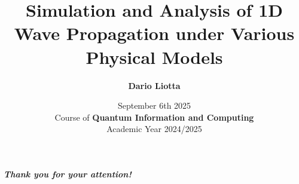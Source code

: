\documentclass[10pt,externalviewer]{beamer}
\title{Simulation and Analysis of 1D Wave Propagation under Various Physical Models}
\author[Dario Liotta]{\large{\textbf{Dario Liotta}}}
\institute[Physics of Data (UniPD)]{
\begin{minipage}[c]{3.4truecm}
\texttt{[image: logo-unipd]}
\end{minipage}
\begin{minipage}[c]{2truecm}
   \begin{flushleft}
   \end{flushleft}
\end{minipage}
\begin{minipage}[c]{4.2truecm}
\texttt{[image: logo-dfa]}
\end{minipage}}
\date{September 6th 2025 \\ Course of \textbf{Quantum Information and Computing} \\ Academic Year 2024/2025}
\begin{document}
\begin{frame}[plain]
\titlepage
\end{frame}







\begin{frame}[c,plain]
  \fontsize{20pt}{10}\selectfont
      \begin{minipage}[c][\textheight][c]{\linewidth}
          \centering
          \emph{\textbf{Thank you for your attention!}}
      \end{minipage}
\end{frame}
\end{document}
